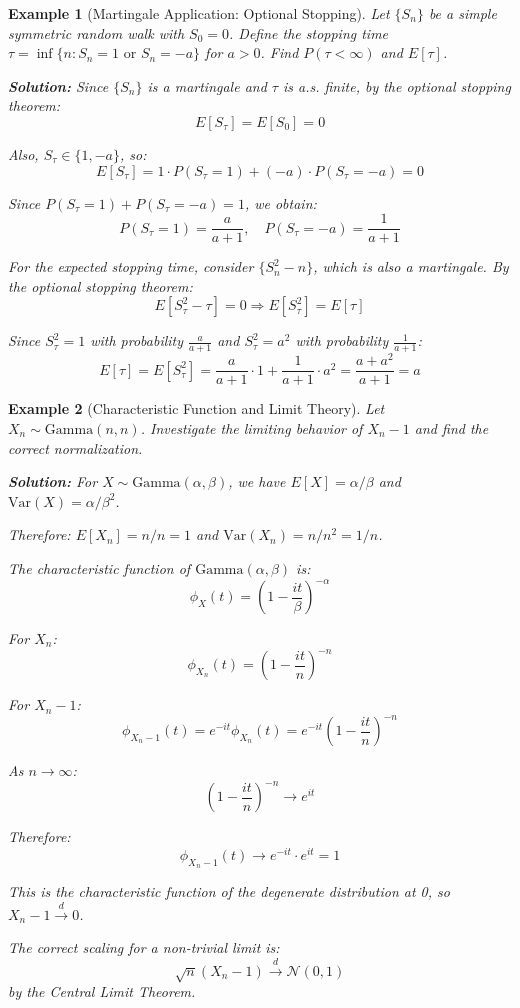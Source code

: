 \documentclass[12pt,a4paper]{article}
\newtheorem{example}{Example}[section]
\theoremstyle{remark}
\begin{document}
\begin{example}[Martingale Application: Optional Stopping]
Let $\{S_n\}$ be a simple symmetric random walk with $S_0 = 0$. Define the stopping time $\tau = \inf\{n: S_n = 1 \text{ or } S_n = -a\}$ for $a > 0$. Find $P(\tau < \infty)$ and $E[\tau]$.

\textbf{Solution:}
Since $\{S_n\}$ is a martingale and $\tau$ is a.s. finite, by the optional stopping theorem:
$$E[S_\tau] = E[S_0] = 0$$

Also, $S_\tau \in \{1, -a\}$, so:
$$E[S_\tau] = 1 \cdot P(S_\tau = 1) + (-a) \cdot P(S_\tau = -a) = 0$$

Since $P(S_\tau = 1) + P(S_\tau = -a) = 1$, we obtain:
$$P(S_\tau = 1) = \frac{a}{a+1}, \quad P(S_\tau = -a) = \frac{1}{a+1}$$

For the expected stopping time, consider $\{S_n^2 - n\}$, which is also a martingale. By the optional stopping theorem:
$$E[S_\tau^2 - \tau] = 0 \Rightarrow E[S_\tau^2] = E[\tau]$$

Since $S_\tau^2 = 1$ with probability $\frac{a}{a+1}$ and $S_\tau^2 = a^2$ with probability $\frac{1}{a+1}$:
$$E[\tau] = E[S_\tau^2] = \frac{a}{a+1} \cdot 1 + \frac{1}{a+1} \cdot a^2 = \frac{a + a^2}{a+1} = a$$
\end{example}

\begin{example}[Characteristic Function and Limit Theory]
Let $X_n \sim \text{Gamma}(n, n)$. Investigate the limiting behavior of $X_n - 1$ and find the correct normalization.

\textbf{Solution:}
For $X \sim \text{Gamma}(\alpha, \beta)$, we have $E[X] = \alpha/\beta$ and $\text{Var}(X) = \alpha/\beta^2$.

Therefore: $E[X_n] = n/n = 1$ and $\text{Var}(X_n) = n/n^2 = 1/n$.

The characteristic function of $\text{Gamma}(\alpha, \beta)$ is:
$$\phi_X(t) = \left(1 - \frac{it}{\beta}\right)^{-\alpha}$$

For $X_n$:
$$\phi_{X_n}(t) = \left(1 - \frac{it}{n}\right)^{-n}$$

For $X_n - 1$:
$$\phi_{X_n - 1}(t) = e^{-it}\phi_{X_n}(t) = e^{-it}\left(1 - \frac{it}{n}\right)^{-n}$$

As $n \to \infty$:
$$\left(1 - \frac{it}{n}\right)^{-n} \to e^{it}$$

Therefore:
$$\phi_{X_n - 1}(t) \to e^{-it} \cdot e^{it} = 1$$

This is the characteristic function of the degenerate distribution at 0, so $X_n - 1 \stackrel{d}{\to} 0$.

The correct scaling for a non-trivial limit is:
$$\sqrt{n}(X_n - 1) \stackrel{d}{\to} \mathcal{N}(0, 1)$$
by the Central Limit Theorem.
\end{example}
\end{document}
